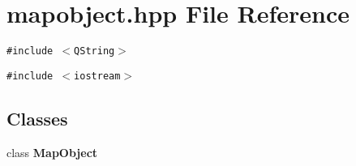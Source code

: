 \section{mapobject.hpp File Reference}
\label{mapobject_8hpp}
{\tt \#include $<$QString$>$}\par
{\tt \#include $<$iostream$>$}\par
\subsection*{Classes}
\begin{CompactItemize}
\item 
class {\bf Map\-Object}
\end{CompactItemize}
